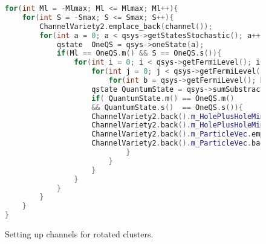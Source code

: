 \documentclass[twoside,english]{uiofysmaster}
\theoremstyle{definition}
\begin{document}
\begin{figure}
	\begin{lstlisting}[language=C++]
for(int Ml = -Mlmax; Ml <= Mlmax; Ml++){
   	for(int S = -Smax; S <= Smax; S++){
   		ChannelVariety2.emplace_back(channel());
   		for(int a = 0; a < qsys->getStatesStochastic(); a++){
   			qstate  OneQS = qsys->oneState(a);
   			if(Ml == OneQS.m() && S == OneQS.s()){
   				for(int i = 0; i < qsys->getFermiLevel(); i++){
   					for(int j = 0; j < qsys->getFermiLevel(); j++){
  						for(int b = qsys->getFermiLevel(); b < qsys->getStatesStochastic(); b++){
					qstate QuantumState = qsys->sumSubstractState(i,j,b);
					if( QuantumState.m() == OneQS.m()
					&& QuantumState.s()  == OneQS.s()){
					ChannelVariety2.back().m_HolePlusHoleMinusParticleVec.emplace_back(channelindexpair());
					ChannelVariety2.back().m_HolePlusHoleMinusParticleVec.back().setThree(i, j, b);
					ChannelVariety2.back().m_ParticleVec.emplace_back(channelindexpair());
					ChannelVariety2.back().m_ParticleVec.back().setOne(a);
  							}
   						}
   					}
   				}
   			}
   		}
   	}
}
\end{lstlisting}
\caption{Setting up channels for rotated clusters.} \label{f:vectors_for_Q4}
\end{figure}
\end{document}
